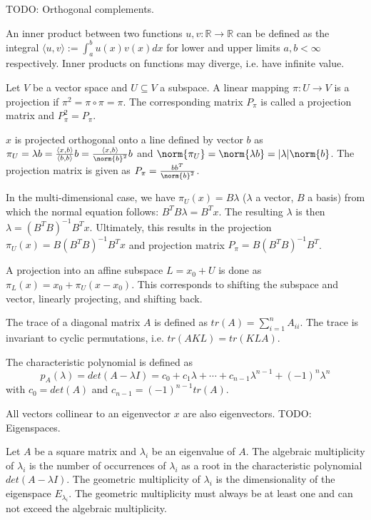 TODO: Orthogonal complements.

An inner product between two functions $u, v : \mathbb{R} \to \mathbb{R}$ can be defined as the integral
$\langle u, v \rangle := \int_a^b{u(x) v(x) dx}$ for lower and upper limits $a, b < \infty$ respectively.
Inner products on functions may diverge, i.e. have infinite value.

Let $V$ be a vector space and $U \subseteq V$ a subspace.
A linear mapping $\pi : U \to V$ is a projection if $\pi^2 = \pi \circ \pi = \pi$.
The corresponding matrix $P_\pi$ is called a projection matrix and $P_\pi^2 = P_\pi$.

$x$ is projected orthogonal onto a line defined by vector $b$ as
$\pi_U = \lambda b = \frac{\langle x, b \rangle}{\langle b, b \rangle} b = \frac{\langle x, b \rangle}{\norm{b}^2} b$
and $\norm{\pi_U} = \norm{\lambda b} = |\lambda| \norm{b}$.
The projection matrix is given as
$P_\pi = \frac{b b^T}{\norm{b}^2}$.

In the multi-dimensional case, we have $\pi_U(x) = B \lambda$ ($\lambda$ a vector, $B$ a basis)
from which the normal equation follows:
$B^T B \lambda = B^T x$.
The resulting $\lambda$ is then $\lambda = (B^T B)^{-1} B^T x$.
Ultimately, this results in the projection
$\pi_U(x) = B (B^T B)^{-1}B^T x$ and projection matrix
$P_\pi = B (B^T B)^{-1} B^T$.

A projection into an affine subspace $L = x_0 + U$ is done as
$\pi_L(x) = x_0 + \pi_U(x - x_0)$.
This corresponds to shifting the subspace and vector, linearly projecting, and shifting back.

The trace of a diagonal matrix $A$ is defined as $tr(A) = \sum_{i=1}^n{A_{ii}}$.
The trace is invariant to cyclic permutations, i.e. $tr(AKL) = tr(KLA)$.

The characteristic polynomial is defined as
\begin{equation*}
    p_A(\lambda) = det(A - \lambda I) = c_0 + c_1 \lambda + \dotsb + c_{n-1} \lambda^{n-1} + (-1)^n \lambda^n
\end{equation*}
with $c_0 = det(A)$ and $c_{n-1} = (-1)^{n-1} tr(A)$.

All vectors collinear to an eigenvector $x$ are also eigenvectors.
TODO: Eigenspaces.

Let $A$ be a square matrix and $\lambda_i$ be an eigenvalue of $A$.
The algebraic multiplicity of $\lambda_i$ is the number of occurrences of $\lambda_i$ as a root in
the characteristic polynomial $det(A - \lambda I)$.
The geometric multiplicity of $\lambda_i$ is the dimensionality of the eigenspace $E_{\lambda_i}$.
The geometric multiplicity must always be at least one and can not exceed the algebraic multiplicity.

